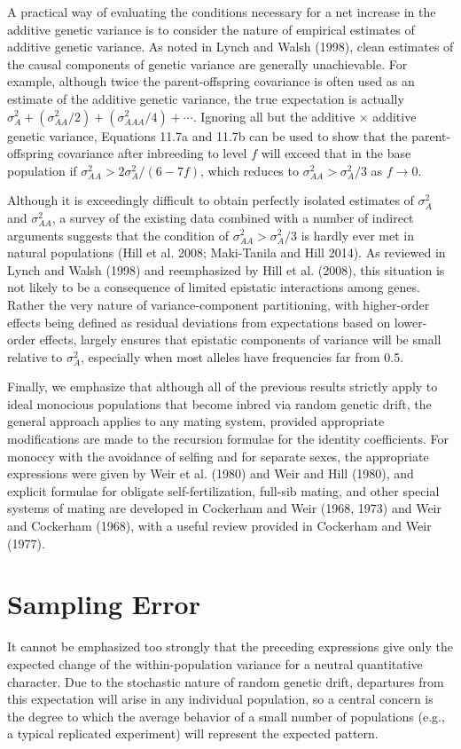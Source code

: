 \documentclass{article}
\begin{document}
A practical way of evaluating the conditions necessary for a net increase in the additive genetic variance is to consider the nature of empirical estimates of additive genetic variance. As noted in Lynch and Walsh (1998), clean estimates of the causal components of genetic variance are generally unachievable. For example, although twice the parent-offspring covariance is often used as an estimate of the additive genetic variance, the true expectation is actually  $ \sigma_A^2 + (\sigma_{AA}^2 / 2) + (\sigma_{AAA}^2 / 4) + \cdots $. Ignoring all but the additive × additive genetic variance, Equations 11.7a and 11.7b can be used to show that the parent-offspring covariance after inbreeding to level  $ f $ will exceed that in the base population if  $ \sigma_{AA}^2 > 2\sigma_A^2 / (6 - 7f) $, which reduces to  $ \sigma_{AA}^2 > \sigma_A^2 / 3 $ as  $ f \to 0 $.

Although it is exceedingly difficult to obtain perfectly isolated estimates of  $ \sigma_A^2 $ and  $ \sigma_{AA}^2 $, a survey of the existing data combined with a number of indirect arguments suggests that the condition of  $ \sigma_{AA}^2 > \sigma_A^2 / 3 $ is hardly ever met in natural populations (Hill et al. 2008; Maki-Tanila and Hill 2014). As reviewed in Lynch and Walsh (1998) and reemphasized by Hill et al. (2008), this situation is not likely to be a consequence of limited epistatic interactions among genes. Rather the very nature of variance-component partitioning, with higher-order effects being defined as residual deviations from expectations based on lower-order effects, largely ensures that epistatic components of variance will be small relative to  $ \sigma_A^2 $, especially when most alleles have frequencies far from 0.5.

Finally, we emphasize that although all of the previous results strictly apply to ideal monocious populations that become inbred via random genetic drift, the general approach applies to any mating system, provided appropriate modifications are made to the recursion formulae for the identity coefficients. For monoccy with the avoidance of selfing and for separate sexes, the appropriate expressions were given by Weir et al. (1980) and Weir and Hill (1980), and explicit formulae for obligate self-fertilization, full-sib mating, and other special systems of mating are developed in Cockerham and Weir (1968, 1973) and Weir and Cockerham (1968), with a useful review provided in Cockerham and Weir (1977).

\section{Sampling Error}
It cannot be emphasized too strongly that the preceding expressions give only the expected change of the within-population variance for a neutral quantitative character. Due to the stochastic nature of random genetic drift, departures from this expectation will arise in any individual population, so a central concern is the degree to which the average behavior of a small number of populations (e.g., a typical replicated experiment) will represent the expected pattern.
\end{document}
